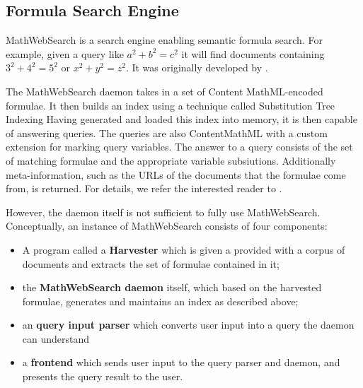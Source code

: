 
\subsection{Formula Search Engine}


MathWebSearch  is a search engine enabling semantic formula search. 
For example, given a query like $a^2 + b^2 = c^2$ it will find documents containing $3^2 + 4^2 = 5^2$ or $x^2 + y^2 = z^2$.
It was originally developed by . 

The MathWebSearch daemon takes in a set of Content MathML-encoded formulae.
It then builds an index using a technique called Substitution Tree Indexing
Having generated and loaded this index into memory, it is then capable of answering queries.
The queries are also ContentMathML with a custom extension for marking query variables.
The answer to a query consists of the set of matching formulae and the appropriate variable subsiutions. 
Additionally meta-information, such as the URLs of the documents that the formulae come from, is returned. 
For details, we refer the interested reader to .  

However, the daemon itself is not sufficient to fully use MathWebSearch. 
Conceptually, an instance of MathWebSearch consists of four components:
\begin{itemize}
    \item A program called a \textbf{Harvester} which is given a provided with a corpus of documents and extracts the set of formulae contained in it;
    \item the \textbf{MathWebSearch daemon} itself, which based on the harvested formulae, generates and maintains an index as described above;
    \item an \textbf{query input parser} which converts user input into a query the daemon can understand
    \item a \textbf{frontend} which sends user input to the query parser and daemon, and presents the query result to the user.  
\end{itemize}


